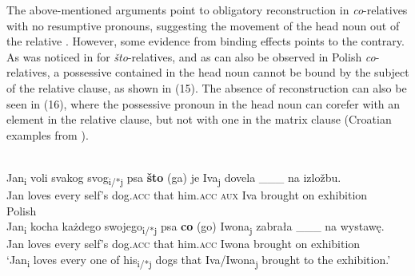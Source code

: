 \documentclass[output=paper]{langsci/langscibook}
\begin{document}
\ea%
    \label{ex:leska:14}
    \z
\z

The above-mentioned arguments point to obligatory reconstruction in \textit{co}{}-relatives with no resumptive pronouns, suggesting the movement of the head noun out of the relative \citep{Åfarli1994,Bhatt2002,Bianchi1999,Brame1968,Vries2002,Hornstein2000,Kayne1994,Safir1999,Schachter1973,Vergnaud1974,Zwart2000}. However, some evidence from binding effects points to the contrary. As was noticed in \citet{Gračanin-Yuksek2013} for  \textit{što}{}-relatives, and as can also be observed in Polish \textit{co}{}-relatives, a possessive  contained in the head noun cannot be bound by the subject of the relative clause, as shown in (15). The absence of reconstruction can also be seen in (16), where the possessive pronoun in the head noun can corefer with an element in the relative clause, but not with one in the matrix clause (Croatian examples from \citealt{Gračanin-Yuksek2013}).

\ea%
    \label{ex:leska:15}
    \ea    {}\\
      \gll Jan\textsubscript{i} voli   svakog   svog\textsubscript{i/*j} psa   \textbf{što} (ga)   je   Iva\textsubscript{j} dovela \_\_\_ na izložbu. \\
           Jan   loves   every   self’s   dog.\textsc{acc}  that  him.\textsc{acc}  \textsc{aux}  Iva   brought {} on exhibition  \\
      \ex   Polish\\
      \gll  Jan\textsubscript{i} kocha   każdego   swojego\textsubscript{i/*j} psa   \textbf{co}   (go)   Iwona\textsubscript{j}    zabrała \_\_\_   na wystawę.       \\
            Jan   loves   every   self’s   dog.\textsc{acc}   that  him.\textsc{acc}  Iwona    brought {}  on exhibition         \\
      \glt  ‘Jan\textsubscript{i} loves every one of his\textsubscript{i/*j} dogs that Iva\slash Iwona\textsubscript{j} brought to the exhibition.’   
    \z
\z
\end{document}
